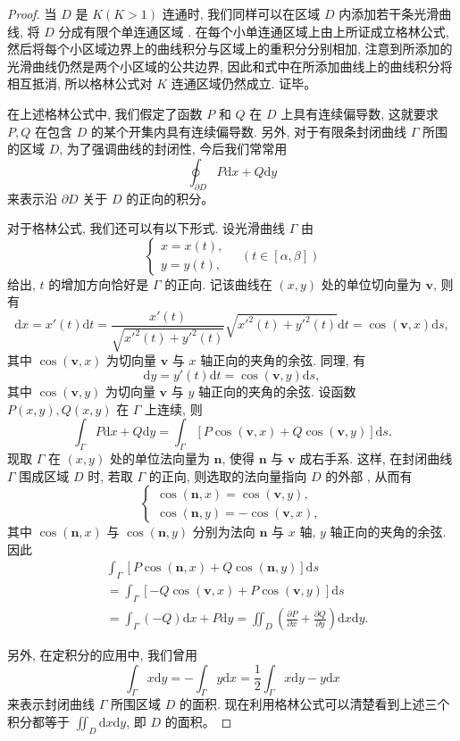 \documentclass[UTF8,12pt,a4paper,fontset=fandol]{ctexart}
\begin{document}
\begin{proof}
当 $D$ 是 $K(K>1)$ 连通时, 我们同样可以在区域 $D$ 内添加若干条光滑曲线, 将 $D$ 分成有限个单连通区域 . 在每个小单连通区域上由上所证成立格林公式, 然后将每个小区域边界上的曲线积分与区域上的重积分分别相加, 注意到所添加的光滑曲线仍然是两个小区域的公共边界, 因此和式中在所添加曲线上的曲线积分将相互抵消, 所以格林公式对 $K$ 连通区域仍然成立. 证毕。

在上述格林公式中, 我们假定了函数 $P$ 和 $Q$ 在 $D$ 上具有连续偏导数, 这就要求 $P,Q$ 在包含 $D$ 的某个开集内具有连续偏导数. 另外, 对于有限条封闭曲线 $\Gamma$ 所围的区域 $D$, 为了强调曲线的封闭性, 今后我们常常用
\[
  \oint_{\partial D}P\mathrm dx+Q\mathrm dy
\]
来表示沿 $\partial D$ 关于 $D$ 的正向的积分。

对于格林公式, 我们还可以有以下形式. 设光滑曲线 $\Gamma$ 由
\[
  \begin{cases}
    x=x(t),\\
    y=y(t),
  \end{cases}\quad (t\in[\alpha,\beta])
\]
给出, $t$ 的增加方向恰好是 $\Gamma$ 的正向. 记该曲线在 $(x,y)$ 处的单位切向量为 $\boldsymbol v$, 则有
\[
  \mathrm dx=x'(t)\mathrm dt
  =\frac{x'(t)}{\sqrt{x'^2(t)+y'^2(t)}}\sqrt{x'^2(t)+y'^2(t)}\mathrm dt
  =\cos(\boldsymbol v,x)\mathrm ds,
\]
其中 $\cos(\boldsymbol v,x)$ 为切向量 $\boldsymbol v$ 与 $x$ 轴正向的夹角的余弦. 同理, 有
\[
  \mathrm dy=y'(t)\mathrm dt=\cos(\boldsymbol v,y)\mathrm ds,
\]
其中 $\cos(\boldsymbol v,y)$ 为切向量 $\boldsymbol v$ 与 $y$ 轴正向的夹角的余弦. 设函数 $P(x,y),Q(x,y)$ 在 $\Gamma$ 上连续, 则
\[
  \int_\Gamma P\mathrm dx+Q\mathrm dy
  =\int_\Gamma[P\cos(\boldsymbol v,x)+Q\cos(\boldsymbol v,y)]\mathrm ds.
\]
现取 $\Gamma$ 在 $(x,y)$ 处的单位法向量为 $\boldsymbol n$, 使得 $\boldsymbol n$ 与 $\boldsymbol v$ 成右手系. 这样, 在封闭曲线 $\Gamma$ 围成区域 $D$ 时, 若取 $\Gamma$ 的正向, 则选取的法向量指向 $D$ 的外部 , 从而有
\[
  \begin{cases}
    \cos(\boldsymbol n,x)=\cos(\boldsymbol v,y),\\
    \cos(\boldsymbol n,y)=-\cos(\boldsymbol v,x),
  \end{cases}
\]
其中 $\cos(\boldsymbol n,x)$ 与 $\cos(\boldsymbol n,y)$ 分别为法向 $\boldsymbol n$ 与 $x$ 轴, $y$ 轴正向的夹角的余弦. 因此
\[
\begin{aligned}
  &\int_\Gamma[P\cos(\boldsymbol n,x)+Q\cos(\boldsymbol n,y)]\mathrm ds\\
  &=\int_\Gamma[-Q\cos(\boldsymbol v,x)+P\cos(\boldsymbol v,y)]\mathrm ds\\
  &=\int_\Gamma(-Q)\mathrm dx+P\mathrm dy
  =\iint_D\left(\frac{\partial P}{\partial x}+\frac{\partial Q}{\partial y}\right)\mathrm dx\mathrm dy.
\end{aligned}
\]

另外, 在定积分的应用中, 我们曾用
\[
  \int_\Gamma x\mathrm dy=-\int_\Gamma y\mathrm dx
  =\frac12\int_\Gamma x\mathrm dy-y\mathrm dx
\]
来表示封闭曲线 $\Gamma$ 所围区域 $D$ 的面积. 现在利用格林公式可以清楚看到上述三个积分都等于 $\iint_D\mathrm dx\mathrm dy$, 即 $D$ 的面积。

\end{proof}
\end{document}
